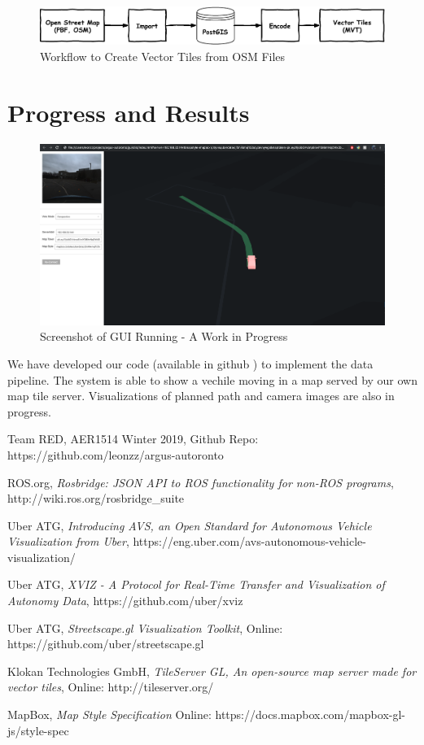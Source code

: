\documentclass{article}
\begin{document}
\begin{figure}[htb]
  \centering
  \includegraphics[width=0.8\linewidth]{map-data-flow.pdf}
  \caption{Workflow to Create Vector Tiles from OSM Files}
  \label{fig:map-flow}
\end{figure}

\section{Progress and Results}

\begin{figure}[hb]
  \centering
  \includegraphics[width=0.7\linewidth]{screenshot.png}
  \caption{Screenshot of GUI Running - A Work in Progress}
  \label{fig:screenshot}
\end{figure}

We have developed our code (available in github \cite{github}) to implement the data pipeline. The system is able to show a vechile moving in a map served by our own map tile server. Visualizations of planned path and camera images are also in progress.

\begin{thebibliography}{7}

Team RED, AER1514 Winter 2019, Github Repo: https://github.com/leonzz/argus-autoronto

ROS.org, \textit{Rosbridge: JSON API to ROS functionality for non-ROS programs}, http://wiki.ros.org/rosbridge\_suite

Uber ATG, \textit{Introducing AVS, an Open Standard for Autonomous Vehicle Visualization from Uber}, https://eng.uber.com/avs-autonomous-vehicle-visualization/

Uber ATG, \textit{XVIZ - A Protocol for Real-Time Transfer and Visualization of Autonomy Data}, https://github.com/uber/xviz

Uber ATG, \textit{Streetscape.gl Visualization Toolkit}, Online: https://github.com/uber/streetscape.gl

Klokan Technologies GmbH, \textit{TileServer GL, An open-source map server made for vector tiles}, Online: http://tileserver.org/

MapBox, \textit{Map Style Specification} Online: https://docs.mapbox.com/mapbox-gl-js/style-spec


\end{thebibliography}
\end{document}
